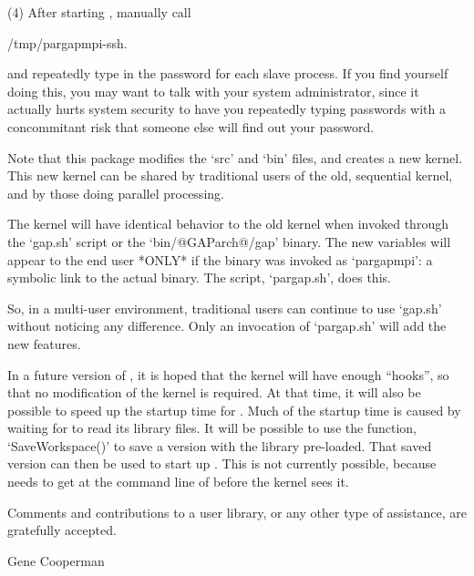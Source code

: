 \item{(4)}
     After starting {\ParGAP}, manually call

\begintt
/tmp/pargapmpi-ssh.$$
\endtt

\item{}
    and repeatedly type in the password for each slave  process.  If  you
    find yourself doing this, you may  want  to  talk  with  your  system
    administrator, since it actually hurts system security  to  have  you
    repeatedly typing passwords with a  concommitant  risk  that  someone
    else will find out your password.

\endlist


Note that this package modifies the {\GAP} `src'  and  `bin'  files,  and
creates a new {\GAP} kernel. This new {\GAP}  kernel  can  be  shared  by
traditional users of the old, sequential  {\GAP}  kernel,  and  by  those
doing parallel processing.

The {\GAP} kernel will have identical behavior to the old  {\GAP}  kernel
when invoked through  the  `gap.sh'  script  or  the  `bin/@GAParch@/gap'
binary. The new {\ParGAP} variables will appear to the end user *ONLY* if
the {\GAP} binary was invoked as `pargapmpi':  a  symbolic  link  to  the
actual {\GAP} binary. The script, `pargap.sh', does this.

So, in a multi-user environment, traditional users can  continue  to  use
`gap.sh'  without  noticing  any  difference.  Only  an   invocation   of
`pargap.sh' will add the new features.

In a future version of {\GAP}, it is hoped that the  {\GAP}  kernel  will
have enough ``hooks'', so that no modification of the  {\GAP}  kernel  is
required. At that time, it will also be possible to speed up the  startup
time for {\ParGAP}. Much of the startup time is  caused  by  waiting  for
{\GAP} to read its library files. It will be possible to use  the  {\GAP}
function, `SaveWorkspace()' to save a version  with  the  {\GAP}  library
pre-loaded. That saved version can then be used to  start  up  {\ParGAP}.
This is not currently possible, because {\ParGAP} needs  to  get  at  the
command line of {\GAP} before the {\GAP} kernel sees it.

Comments and contributions to a {\ParGAP} user library, or any other type
of assistance, are gratefully accepted.


Gene Cooperman

